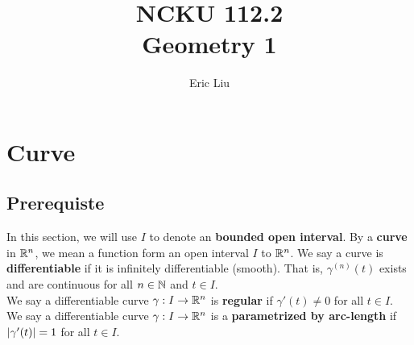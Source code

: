 \documentclass{report}
\title{\Huge{NCKU 112.2}\\
Geometry 1}
\author{\huge{Eric Liu}}
\date{}
\begin{document}
\maketitle
\newpage%
\tableofcontents
\pagebreak
\chapter{Curve}
\section{Prerequiste}
\begin{mdframed}
In this section, we will use $I$ to denote an \textbf{bounded open interval}. By a \textbf{curve} in $\mathbb{R}^n$, we mean a function form an open interval $I$ to $\mathbb{R}^n$.  We say a curve is \textbf{differentiable} if it is infinitely differentiable (smooth). That is, $\gamma ^{(n)}(t)$ exists and are continuous for all $n\in\mathbb{N}$ and $t \in I$.\\

We say a differentiable curve $\gamma  :I\rightarrow \mathbb{R}^n$ is \textbf{regular} if $\gamma '(t)\neq 0$ for all $t  \in I$. We say a differentiable curve $\gamma :I\rightarrow \mathbb{R}^n$ is a \textbf{parametrized by arc-length} if $\left|\gamma '(t)\right|=1$ for all $t \in I$. 
\end{mdframed}
\end{document}
